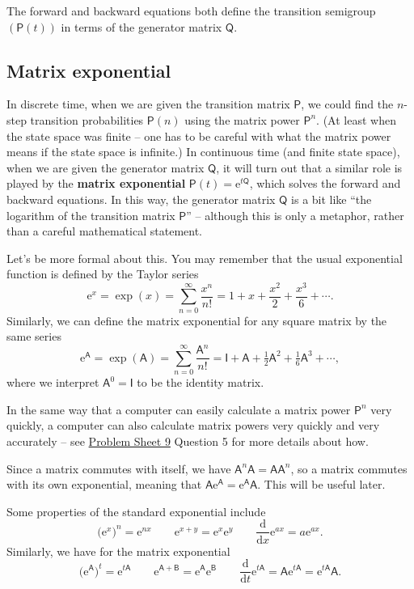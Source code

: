\documentclass[
  a4paper,
]{article}
\theoremstyle{definition}
\theoremstyle{definition}
\theoremstyle{definition}
\theoremstyle{remark}
\begin{document}
The forward and backward equations both define the transition semigroup \((\mathsf P(t))\) in terms of the generator matrix \(\mathsf Q\).

\hypertarget{matrix-exp}{%
\subsection{Matrix exponential}\label{matrix-exp}}

In discrete time, when we are given the transition matrix \(\mathsf P\), we could find the \(n\)-step transition probabilities \(\mathsf P(n)\) using the matrix power \(\mathsf P^n\). (At least when the state space was finite -- one has to be careful with what the matrix power means if the state space is infinite.) In continuous time (and finite state space), when we are given the generator matrix \(\mathsf Q\), it will turn out that a similar role is played by the \textbf{matrix exponential} \(\mathsf P(t) = \mathrm{e}^{t\mathsf Q}\), which solves the forward and backward equations. In this way, the generator matrix \(\mathsf Q\) is a bit like ``the logarithm of the transition matrix \(\mathsf P\)'' -- although this is only a metaphor, rather than a careful mathematical statement.

Let's be more formal about this. You may remember that the usual exponential function is defined by the Taylor series
\[ \mathrm{e}^x = \exp(x) = \sum_{n=0}^\infty \frac{x^n}{n!} = 1 + x + \frac{x^2}{2} + \frac{x^3}{6} + \cdots. \]
Similarly, we can define the matrix exponential for any square matrix by the same series
\[ \mathrm{e}^{\mathsf A} = \exp({\mathsf A}) = \sum_{n=0}^\infty \frac{{\mathsf A}^n}{n!} = {\mathsf I} + {\mathsf A} + \tfrac12 \mathsf A^2+ \tfrac16 \mathsf A^3 + \cdots, \]
where we interpret \(\mathsf A^0 = \mathsf I\) to be the identity matrix.

In the same way that a computer can easily calculate a matrix power \(\mathsf P^n\) very quickly, a computer can also calculate matrix powers very quickly and very accurately -- see \protect\hyperlink{P09}{Problem Sheet 9} Question 5 for more details about how.

Since a matrix commutes with itself, we have \(\mathsf {A}^n \mathsf A = \mathsf{AA}^n\), so a matrix commutes with its own exponential, meaning that \(\mathsf A \mathrm{e}^{\mathsf A} = \mathrm{e}^{\mathsf A} \mathsf A\). This will be useful later.

Some properties of the standard exponential include
\[ (\mathrm{e}^x\big)^n = \mathrm{e}^{nx} \qquad \mathrm{e}^{x+y} = \mathrm{e}^x \mathrm{e}^y \qquad \frac{\mathrm d}{\mathrm d x} \mathrm{e}^{ax} = a \mathrm{e}^{ax} . \]
Similarly, we have for the matrix exponential
\[ (\mathrm{e}^{\mathsf A}\big)^t = \mathrm{e}^{t{\mathsf A}} \qquad \mathrm{e}^{\mathsf A + \mathsf B} = \mathrm{e}^{\mathsf A} \mathrm{e}^{\mathsf B} \qquad \frac{\mathrm d}{\mathrm d t} \mathrm{e}^{t{\mathsf A}} = {\mathsf A} \mathrm{e}^{t{\mathsf A}} = \mathrm{e}^{t{\mathsf A}} {\mathsf A} . \]
\end{document}

